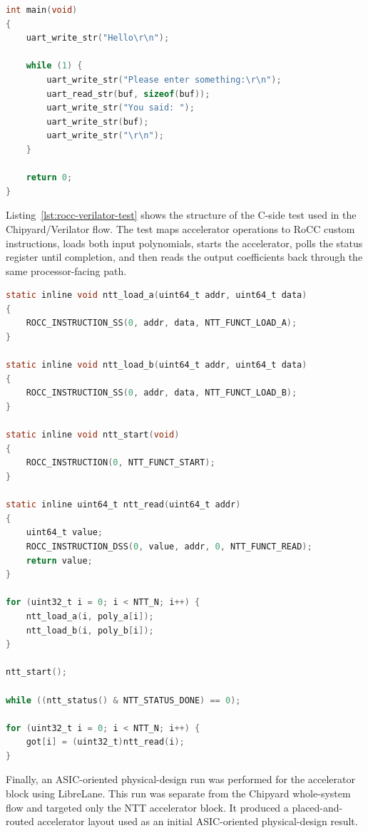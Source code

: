 \documentclass[a4paper, 12pt, titlepage]{article}
\begin{document}
\begin{lstlisting}[language=C,caption={Bare-metal UART echo test used for the custom RISC-V core},label={lst:uart-echo-test}]
int main(void)
{
    uart_write_str("Hello\r\n");

    while (1) {
        uart_write_str("Please enter something:\r\n");
        uart_read_str(buf, sizeof(buf));
        uart_write_str("You said: ");
        uart_write_str(buf);
        uart_write_str("\r\n");
    }

    return 0;
}
\end{lstlisting}

Listing~\ref{lst:rocc-verilator-test} shows the structure of the C-side test
used in the Chipyard/Verilator flow. The test maps accelerator operations to
RoCC custom instructions, loads both input polynomials, starts the accelerator,
polls the status register until completion, and then reads the output
coefficients back through the same processor-facing path.

\begin{lstlisting}[language=C,caption={Chipyard/Verilator RoCC test structure for invoking the NTT accelerator},label={lst:rocc-verilator-test}]
static inline void ntt_load_a(uint64_t addr, uint64_t data)
{
    ROCC_INSTRUCTION_SS(0, addr, data, NTT_FUNCT_LOAD_A);
}

static inline void ntt_load_b(uint64_t addr, uint64_t data)
{
    ROCC_INSTRUCTION_SS(0, addr, data, NTT_FUNCT_LOAD_B);
}

static inline void ntt_start(void)
{
    ROCC_INSTRUCTION(0, NTT_FUNCT_START);
}

static inline uint64_t ntt_read(uint64_t addr)
{
    uint64_t value;
    ROCC_INSTRUCTION_DSS(0, value, addr, 0, NTT_FUNCT_READ);
    return value;
}

for (uint32_t i = 0; i < NTT_N; i++) {
    ntt_load_a(i, poly_a[i]);
    ntt_load_b(i, poly_b[i]);
}

ntt_start();

while ((ntt_status() & NTT_STATUS_DONE) == 0);

for (uint32_t i = 0; i < NTT_N; i++) {
    got[i] = (uint32_t)ntt_read(i);
}
\end{lstlisting}

Finally, an ASIC-oriented physical-design run was performed for the accelerator
block using LibreLane. This run was separate from the Chipyard whole-system
flow and targeted only the NTT accelerator block. It produced a
placed-and-routed accelerator layout used as an initial ASIC-oriented
physical-design result.
\end{document}
